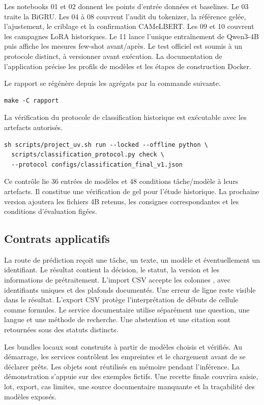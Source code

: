 Les notebooks 01 et 02 donnent les points d’entrée données et baselines. Le 03 traite la BiGRU. Les 04 à 08 couvrent l’audit du tokenizer, la référence gelée, l’ajustement, le criblage et la confirmation CAMeLBERT. Les 09 et 10 couvrent les campagnes LoRA historiques. Le 11 lance l’unique entraînement de Qwen3-4B puis affiche les mesures few-shot avant/après. Le test officiel est soumis à un protocole distinct, à versionner avant exécution. La documentation de l’application précise les profils de modèles et les étapes de construction Docker.

Le rapport se régénère depuis les agrégats par la commande suivante.
\begin{verbatim}
make -C rapport
\end{verbatim}
La vérification du protocole de classification historique est exécutable avec les artefacts autorisés.
\begin{verbatim}
sh scripts/project_uv.sh run --locked --offline python \
  scripts/classification_protocol.py check \
  --protocol configs/classification_final_v1.json
\end{verbatim}
Ce contrôle lie 36 entrées de modèles et 48 conditions tâche/modèle à leurs artefacts. Il constitue une vérification de gel pour l’étude historique. La prochaine version ajoutera les fichiers 4B retenus, les consignes correspondantes et les conditions d’évaluation figées.

\subsection{Contrats applicatifs}
La route de prédiction reçoit une tâche, un texte, un modèle et éventuellement un identifiant. Le résultat contient la décision, le statut, la version et les informations de prétraitement. L’import CSV accepte les colonnes , avec identifiants uniques et des plafonds documentés. Une erreur de ligne reste visible dans le résultat. L’export CSV protège l’interprétation de débuts de cellule comme formules. Le service documentaire utilise séparément une question, une langue et une méthode de recherche. Une abstention et une citation sont retournées sous des statuts distincts.

Les bundles locaux sont construits à partir de modèles choisis et vérifiés. Au démarrage, les services contrôlent les empreintes et le chargement avant de se déclarer prêts. Les objets sont réutilisés en mémoire pendant l’inférence. La démonstration s’appuie sur des exemples fictifs. Une recette finale couvrira saisie, lot, export, cas limites, une source documentaire manquante et la traçabilité des modèles exposés.

